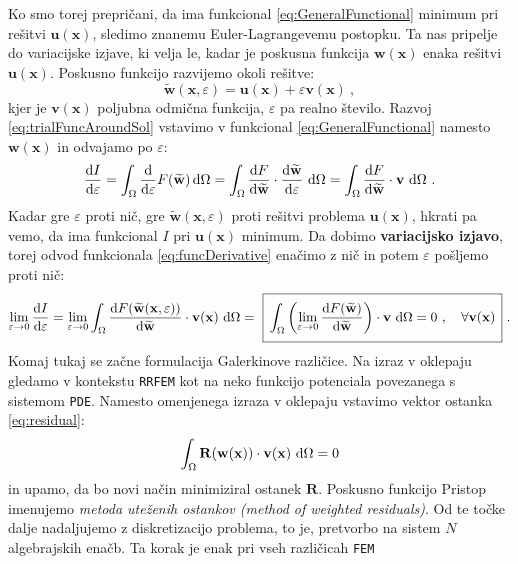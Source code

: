 Ko smo torej prepričani, da ima funkcional \eqref{eq:GeneralFunctional} minimum pri rešitvi $\mathbf{u}(\mathbf{x})$, sledimo znanemu Euler-Lagrangevemu postopku. Ta nas pripelje do variacijske izjave, ki velja le, kadar je poskusna funkcija $\mathbf{w}(\mathbf{x})$ enaka rešitvi $\mathbf{u}(\mathbf{x})$. Poskusno funkcijo razvijemo okoli rešitve:
\begin{equation}
	\widetilde{\mathbf{w}}(\mathbf{x}, \varepsilon) = \mathbf{u}(\mathbf{x}) + \varepsilon \mathbf{v}(\mathbf{x}) \ ,
	\label{eq:trialFuncAroundSol}
\end{equation}
kjer je $\mathbf{v}(\mathbf{x})$ poljubna odmična funkcija, $\varepsilon$ pa realno število. Razvoj \eqref{eq:trialFuncAroundSol} vstavimo v funkcional \eqref{eq:GeneralFunctional} namesto $\mathbf{w}(\mathbf{x})$ in odvajamo po $\varepsilon$:
\begin{equation}
\frac{\mathrm{d} I}{\mathrm{d} \varepsilon} = \int_{\Omega} \frac{\mathrm{d}}{\mathrm{d} \varepsilon} F(\widetilde{\mathbf{w}}) \, \mathrm{d} \Omega = \int_{\Omega} \frac{\mathrm{d} F}{\mathrm{d} \widetilde{\mathbf{w}}} \cdot \frac{\mathrm{d} \widetilde{\mathbf{w}}}{\mathrm{d} \varepsilon} \ \mathrm{d} \Omega = \int_{\Omega} \frac{\mathrm{d} F}{\mathrm{d} \widetilde{\mathbf{w}}} \cdot \mathbf{v} \ \mathrm{d} \Omega \ .
\label{eq:funcDerivative}
\end{equation}
Kadar gre $\varepsilon$ proti nič, gre $\widetilde{\mathbf{w}}(\mathbf{x}, \varepsilon)$ proti rešitvi problema $\mathbf{u}(\mathbf{x})$, hkrati pa vemo, da ima funkcional $I$ pri $\mathbf{u}(\mathbf{x})$ minimum. Da dobimo \textbf{variacijsko izjavo}, torej odvod funkcionala \eqref{eq:funcDerivative} enačimo z nič in potem $\varepsilon$ pošljemo proti nič:
\begin{equation}
	\lim_{\varepsilon \rightarrow 0} \frac{\ud I}{\ud \varepsilon} = \lim_{\varepsilon \rightarrow 0} \int_{\Omega} \frac{\ud F(\widetilde{\mathbf{w}}(\mathbf{x}, \varepsilon))}{\ud \widetilde{\mathbf{w}}} \cdot \mathbf{v(\mathbf{x})} \ \ud \Omega = \ \boxed{\, \int_{\Omega} \left( \lim_{\varepsilon \rightarrow 0} \frac{\ud F(\widetilde{\mathbf{w}})}{\ud \widetilde{\mathbf{w}}} \right) \cdot \mathbf{v} \ \ud \Omega = 0 \ , \quad \forall \mathbf{v(\mathbf{x})}\, \vphantom{\Biggr{)}}} \ .
\end{equation}
Komaj tukaj se začne formulacija Galerkinove različice. Na izraz v oklepaju gledamo v kontekstu \texttt{RRFEM} kot na neko funkcijo potenciala povezanega s sistemom \texttt{PDE}. Namesto omenjenega izraza v oklepaju vstavimo vektor ostanka \eqref{eq:residual}:
\begin{equation}
	\int_{\Omega} \mathbf{R(w(x))} \cdot \mathbf{v(x)} \ \mathrm{d} \Omega = 0
\end{equation}
in upamo, da bo novi način minimiziral ostanek $\mathbf{R}$. Poskusno funkcijo  Pristop imenujemo \emph{metoda uteženih ostankov (method of weighted residuals)}. Od te točke dalje nadaljujemo z diskretizacijo problema, to je, pretvorbo na sistem $N$ algebrajskih enačb. Ta korak je enak pri vseh različicah \texttt{FEM}

